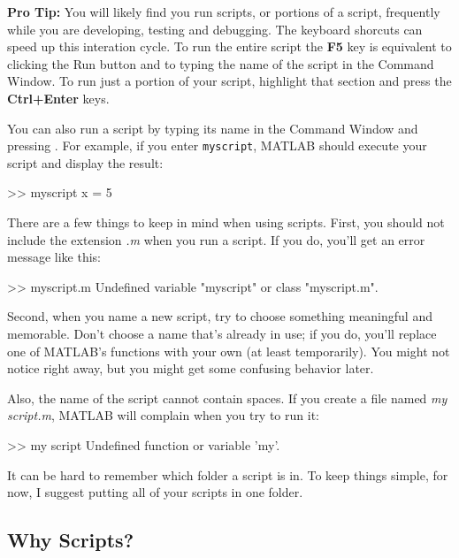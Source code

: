 \documentclass[../../book.tex]{subfiles}
\begin{document}

\textbf{Pro Tip:} You will likely find you run scripts, or portions of a script, frequently while you are developing, testing and debugging.  The keyboard shorcuts can speed up this interation cycle.  To run the entire script the \textbf{F5} key is equivalent to clicking the Run button and to typing the name of the script in the Command Window.  To run just a portion of your script, highlight that section and press the \textbf{Ctrl+Enter} keys.

You can also run a script by typing its name in the Command Window and pressing . For example, if you enter \lstinline{myscript}, MATLAB should execute your script and display the result:

\begin{code}
>> myscript
x = 5
\end{code}

There are a few things to keep in mind when using scripts. First, you should not include the extension \emph{.m} when you run a script.  If you do, you'll get an error message like this:

\begin{code}
>> myscript.m
Undefined variable "myscript" or class "myscript.m".
\end{code}

Second, when you name a new script, try to choose something meaningful and memorable.
Don't choose a name that's already in use; if you do, you'll replace one of MATLAB's functions with your own (at least temporarily).
You might not notice right away, but you might get some confusing behavior later.


Also, the name of the script cannot contain spaces.  If you create
a file named \emph{my script.m}, MATLAB will complain when you try
to run it:

\begin{code}
>> my script
Undefined function or variable 'my'.
\end{code}

It can be hard to remember which folder a script is in.  To keep things simple,
for now, I suggest putting all of your scripts in one folder.

\subsection{Why Scripts?}
\end{document}

